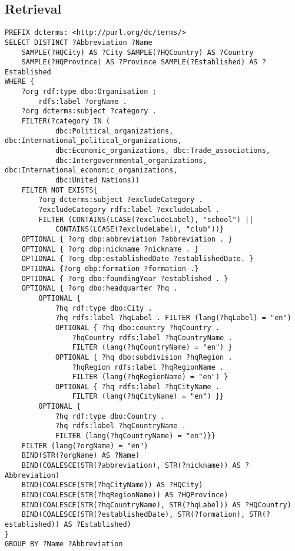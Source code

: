 \documentclass[11pt]{article}
\begin{document}
\subsection{Retrieval}
{\footnotesize\begin{verbatim}
PREFIX dcterms: <http://purl.org/dc/terms/>
SELECT DISTINCT ?Abbreviation ?Name
    SAMPLE(?HQCity) AS ?City SAMPLE(?HQCountry) AS ?Country
    SAMPLE(?HQProvince) AS ?Province SAMPLE(?Established) AS ?Established
WHERE {
    ?org rdf:type dbo:Organisation ;
        rdfs:label ?orgName .
    ?org dcterms:subject ?category .
    FILTER(?category IN (
            dbc:Political_organizations, dbc:International_political_organizations,
            dbc:Economic_organizations, dbc:Trade_associations,
            dbc:Intergovernmental_organizations, dbc:International_economic_organizations,
            dbc:United_Nations))
    FILTER NOT EXISTS{
        ?org dcterms:subject ?excludeCategory .
        ?excludeCategory rdfs:label ?excludeLabel .
        FILTER (CONTAINS(LCASE(?excludeLabel), "school") || 
            CONTAINS(LCASE(?excludeLabel), "club"))}
    OPTIONAL { ?org dbp:abbreviation ?abbreviation . }
    OPTIONAL { ?org dbp:nickname ?nickname . }
    OPTIONAL { ?org dbp:establishedDate ?establishedDate. }
    OPTIONAL {?org dbp:formation ?formation .}
    OPTIONAL { ?org dbo:foundingYear ?established . }
    OPTIONAL { ?org dbo:headquarter ?hq . 
        OPTIONAL { 
            ?hq rdf:type dbo:City .
            ?hq rdfs:label ?hqLabel . FILTER (lang(?hqLabel) = "en")
            OPTIONAL { ?hq dbo:country ?hqCountry .
                ?hqCountry rdfs:label ?hqCountryName .
                FILTER (lang(?hqCountryName) = "en") }
            OPTIONAL { ?hq dbo:subdivision ?hqRegion .
                ?hqRegion rdfs:label ?hqRegionName .
                FILTER (lang(?hqRegionName) = "en") }
            OPTIONAL { ?hq rdfs:label ?hqCityName .
                FILTER (lang(?hqCityName) = "en") }}    
        OPTIONAL {
            ?hq rdf:type dbo:Country .
            ?hq rdfs:label ?hqCountryName .
            FILTER (lang(?hqCountryName) = "en")}}
    FILTER (lang(?orgName) = "en")
    BIND(STR(?orgName) AS ?Name)
    BIND(COALESCE(STR(?abbreviation), STR(?nickname)) AS ?Abbreviation)
    BIND(COALESCE(STR(?hqCityName)) AS ?HQCity)
    BIND(COALESCE(STR(?hqRegionName)) AS ?HQProvince)
    BIND(COALESCE(STR(?hqCountryName), STR(?hqLabel)) AS ?HQCountry)
    BIND(COALESCE(STR(?establishedDate), STR(?formation), STR(?established)) AS ?Established)
}
GROUP BY ?Name ?Abbreviation
\end{verbatim}}
\end{document}
